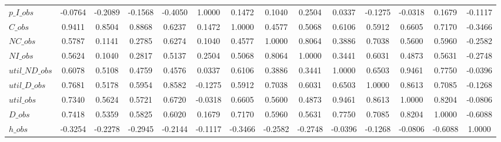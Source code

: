 \begin{center}
\begin{longtable}{lccccccccccccc}
$p\_I\_obs      $	 & 	          -0.0764	 & 	          -0.2089	 & 	          -0.1568	 & 	          -0.4050	 & 	           1.0000	 & 	           0.1472	 & 	           0.1040	 & 	           0.2504	 & 	           0.0337	 & 	          -0.1275	 & 	          -0.0318	 & 	           0.1679	 & 	          -0.1117 \\ 
$C\_obs         $	 & 	           0.9411	 & 	           0.8504	 & 	           0.8868	 & 	           0.6237	 & 	           0.1472	 & 	           1.0000	 & 	           0.4577	 & 	           0.5068	 & 	           0.6106	 & 	           0.5912	 & 	           0.6605	 & 	           0.7170	 & 	          -0.3466 \\ 
$NC\_obs        $	 & 	           0.5787	 & 	           0.1141	 & 	           0.2785	 & 	           0.6274	 & 	           0.1040	 & 	           0.4577	 & 	           1.0000	 & 	           0.8064	 & 	           0.3886	 & 	           0.7038	 & 	           0.5600	 & 	           0.5960	 & 	          -0.2582 \\ 
$NI\_obs        $	 & 	           0.5624	 & 	           0.1040	 & 	           0.2817	 & 	           0.5137	 & 	           0.2504	 & 	           0.5068	 & 	           0.8064	 & 	           1.0000	 & 	           0.3441	 & 	           0.6031	 & 	           0.4873	 & 	           0.5631	 & 	          -0.2748 \\ 
$util\_ND\_obs  $	 & 	           0.6078	 & 	           0.5108	 & 	           0.4759	 & 	           0.4576	 & 	           0.0337	 & 	           0.6106	 & 	           0.3886	 & 	           0.3441	 & 	           1.0000	 & 	           0.6503	 & 	           0.9461	 & 	           0.7750	 & 	          -0.0396 \\ 
$util\_D\_obs   $	 & 	           0.7681	 & 	           0.5178	 & 	           0.5954	 & 	           0.8582	 & 	          -0.1275	 & 	           0.5912	 & 	           0.7038	 & 	           0.6031	 & 	           0.6503	 & 	           1.0000	 & 	           0.8613	 & 	           0.7085	 & 	          -0.1268 \\ 
$util\_obs      $	 & 	           0.7340	 & 	           0.5624	 & 	           0.5721	 & 	           0.6720	 & 	          -0.0318	 & 	           0.6605	 & 	           0.5600	 & 	           0.4873	 & 	           0.9461	 & 	           0.8613	 & 	           1.0000	 & 	           0.8204	 & 	          -0.0806 \\ 
$D\_obs         $	 & 	           0.7418	 & 	           0.5359	 & 	           0.5825	 & 	           0.6020	 & 	           0.1679	 & 	           0.7170	 & 	           0.5960	 & 	           0.5631	 & 	           0.7750	 & 	           0.7085	 & 	           0.8204	 & 	           1.0000	 & 	          -0.6088 \\ 
$h\_obs         $	 & 	          -0.3254	 & 	          -0.2278	 & 	          -0.2945	 & 	          -0.2144	 & 	          -0.1117	 & 	          -0.3466	 & 	          -0.2582	 & 	          -0.2748	 & 	          -0.0396	 & 	          -0.1268	 & 	          -0.0806	 & 	          -0.6088	 & 	           1.0000 \\ 
\end{longtable}
 \end{center}
